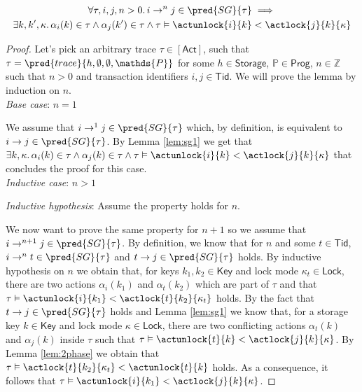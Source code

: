 \lem \label{lem:sg2}
\begin{gather*}
\forall \tau, i, j, n > 0 \ldotp i \rightarrow^n j \in \pred{SG}{\tau} \implies \\
\exists k, k', \kappa \ldotp \alpha_i(k) \in \tau \land \alpha_j(k') \in \tau \land \tau \vDash \actunlock{i}{k} < \actlock{j}{k}{\kappa}
\end{gather*}

{\parindent0pt
\begin{proof}
Let's pick an arbitrary trace $\tau \in \mathsf{[Act]}$, such that $\tau = \pred{trace}{h, \emptyset, \emptyset, \mathds{P}}$ for some $h \in \mathsf{Storage}$, $\mathds{P} \in \mathsf{Prog}$, $n \in \mathds{Z}$ such that $n > 0$ and transaction identifiers $i, j \in \mathsf{Tid}$. We will prove the lemma by induction on $n$. \\

\textit{Base case}: $n = 1$

We assume that $i \rightarrow^1 j \in \pred{SG}{\tau}$ which, by definition, is equivalent to $i \rightarrow j \in \pred{SG}{\tau}$. By Lemma \ref{lem:sg1} we get that $\exists k, \kappa \ldotp \alpha_i(k) \in \tau \land \alpha_j(k) \in \tau \land \tau \vDash \actunlock{i}{k} < \actlock{j}{k}{\kappa}$ that concludes the proof for this case. \\

\textit{Inductive case}: $n > 1$

\textit{Inductive hypothesis}: Assume the property holds for $n$.

We now want to prove the same property for $n + 1$ so we assume that $i \rightarrow^{n+1} j \in \pred{SG}{\tau}$. By definition, we know that for $n$ and some $t \in \mathsf{Tid}$, $i \rightarrow^n t \in \pred{SG}{\tau}$ and $t \rightarrow j \in \pred{SG}{\tau}$ holds. By inductive hypothesis on $n$ we obtain that, for keys $k_1, k_2 \in \mathsf{Key}$ and lock mode $\kappa_t \in \mathsf{Lock}$, there are two actions $\alpha_i(k_1)$ and $\alpha_t(k_2)$ which are part of $\tau$ and that $\tau \vDash \actunlock{i}{k_1} < \actlock{t}{k_2}{\kappa_t}$ holds. By the fact that $t \rightarrow j \in \pred{SG}{\tau}$ holds and Lemma \ref{lem:sg1} we know that, for a storage key $k \in \mathsf{Key}$ and lock mode $\kappa \in \mathsf{Lock}$, there are two conflicting actions $\alpha_t(k)$ and $\alpha_j(k)$ inside $\tau$ such that $\tau \vDash \actunlock{t}{k} < \actlock{j}{k}{\kappa}$. By Lemma \ref{lem:2phase} we obtain that $\tau \vDash \actlock{t}{k_2}{\kappa_t} < \actunlock{t}{k}$ holds. As a consequence, it follows that $\tau \vDash \actunlock{i}{k_1} < \actlock{j}{k}{\kappa}$.
\end{proof}
}

